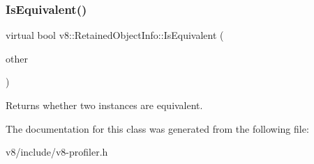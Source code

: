 \subsubsection{\texorpdfstring{Is\+Equivalent()}{IsEquivalent()}}
{\footnotesize\ttfamily virtual bool v8\+::\+Retained\+Object\+Info\+::\+Is\+Equivalent (\begin{DoxyParamCaption}\item[{\mbox{\hyperlink{classv8_1_1RetainedObjectInfo}{Retained\+Object\+Info}} $\ast$}]{other }\end{DoxyParamCaption})\hspace{0.3cm}{\ttfamily [pure virtual]}}

Returns whether two instances are equivalent. 

The documentation for this class was generated from the following file\+:\begin{DoxyCompactItemize}
\item 
v8/include/v8-\/profiler.\+h\end{DoxyCompactItemize}
